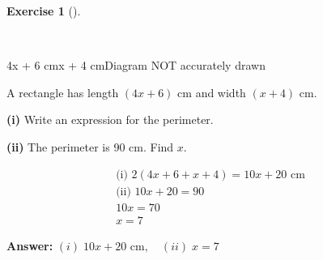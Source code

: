 \documentclass[
  letterpaper,
  DIV=11,
  numbers=noendperiod]{scrreprt}
\theoremstyle{definition}
\newtheorem{exercise}{Exercise}[chapter]
\theoremstyle{remark}
\begin{document}
\begin{exercise}[]\protect\hypertarget{exr-u5-21-1}{}\label{exr-u5-21-1}

~

4x + 6 cmx + 4 cmDiagram NOT accurately drawn

A rectangle has length \((4x + 6)\) cm and width \((x + 4)\) cm.

\textbf{(i)} Write an expression for the perimeter.

\textbf{(ii)} The perimeter is 90 cm. Find \(x\).

\begin{tcolorbox}[enhanced jigsaw, opacitybacktitle=0.6, coltitle=black, arc=.35mm, colframe=quarto-callout-tip-color-frame, colback=white, bottomrule=.15mm, left=2mm, colbacktitle=quarto-callout-tip-color!10!white, titlerule=0mm, opacityback=0, title=\textcolor{quarto-callout-tip-color}{\faLightbulb}\hspace{0.5em}{🔍 View Solution}, leftrule=.75mm, breakable, rightrule=.15mm, bottomtitle=1mm, toptitle=1mm, toprule=.15mm]

\begin{align*}
\text{(i) } 2(4x + 6 + x + 4) = 10x + 20 \text{ cm} \\ \text{(ii) } 10x + 20 = 90 \\ 10x = 70 \\ x = 7
\end{align*}

\textbf{Answer:} \((i)\; 10x + 20 \text{ cm},\quad (ii)\; x = 7\)

\end{tcolorbox}

\end{exercise}
\end{document}
